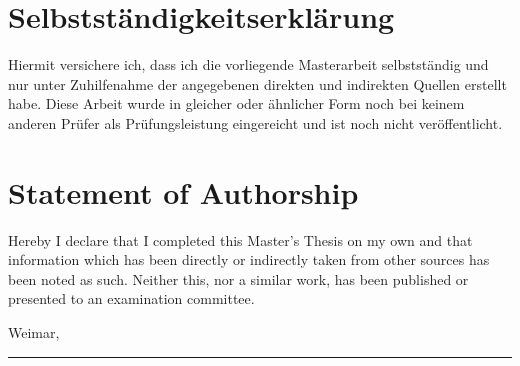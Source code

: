 
\section*{Selbstständigkeitserklärung}

\vspace{1em}

Hiermit versichere ich, dass ich die vorliegende Masterarbeit selbstständig und nur unter Zuhilfenahme der angegebenen direkten und indirekten Quellen erstellt habe. Diese Arbeit wurde in gleicher oder ähnlicher Form noch bei keinem anderen Prüfer als Prüfungsleistung eingereicht und ist noch nicht veröffentlicht.

\vspace{5em}

\section*{Statement of Authorship}

\vspace{1em}

Hereby I declare that I completed this Master's Thesis on my own and that information which has been directly or indirectly taken from other sources has been noted as such. Neither this, nor a similar work, has been published or presented to an examination committee.

\vspace{7em}


\begin{minipage}[t]{0.55\textwidth}
  Weimar, \submissionDate
\end{minipage} %
\begin{minipage}[t]{0.45\textwidth}
  \begin{center}
    \rule{1.0\textwidth}{0.01cm} \\
    \thesisauthor
  \end{center}
\end{minipage}


\newpage